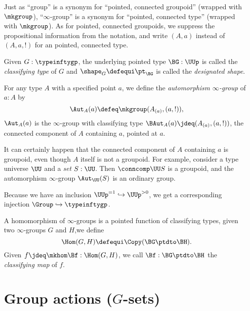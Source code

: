 \begin{remark}\label{rem:pointedtypes}
  Just as ``group'' is a synonym for ``pointed, connected groupoid''
  (wrapped with $\mkgroup$),
  ``$\infty$-group'' is a synonym for ``pointed, connected type''
  (wrapped with $\mkgroup$).
  As for pointed, connected groupoids,
  we suppress the propositional information from the notation,
  and write $(A,a)$ instead of $(A,a,!)$ for an pointed, connected type.
\end{remark}

\begin{definition}\label{def:classifyingspace}
  Given $G:\typeinftygp$,
  the underlying pointed type $\BG : \UUp$
  is called the  \emph{classifying type} of $G$ and $\shape_G\defequi \pt_{\BG}$
  is called the \emph{designated shape}.
\end{definition}

\begin{definition}
  For any type $A$ with a specified point $a$,
  we define the \emph{automorphism $\infty$-group} of $a:A$ by
  \[
    \Aut_A(a) \defeq \mkgroup (A_{(a)},(a,!)),
  \]
  \ie $\Aut_A(a)$ is the $\infty$-group with classifying type
  $\BAut_A(a) \jdeq (A_{(a)},(a,!))$,
  the connected component of $A$ containing $a$, pointed at $a$.
\end{definition}

\begin{remark}\label{rem:autinfgp}
  It can certainly happen that the connected component of $A$ containing $a$
  is groupoid, even though $A$ itself is not a groupoid.
  For example, consider a type universe $\UU$ and a \emph{set} $S:\UU$.
  Then $\conncomp\UU S$ is a groupoid, and the automorphism $\infty$-group
  $\Aut_\UU(S)$ is an ordinary group.

  Because we have an inclusion $\UUp^{=1} \hookrightarrow \UUp^{>0}$,
  we get a corresponding injection $\Group \hookrightarrow \typeinftygp$.
\end{remark}

\begin{definition}
  A homomorphism of $\infty$-groups is a pointed function of classifying types, \ie
  given two $\infty$-groups $G$ and $H$,we define
  \[
    \Hom(G,H)\defequi\Copy(\BG\ptdto\BH).
  \]
  Given $f \jdeq \mkhom\Bf: \Hom(G,H)$, we call
  $\Bf : \BG\ptdto\BH$ the \emph{classifying map} of $f$.
\end{definition}

\section{Group actions ($G$-sets)}
\label{sec:gsets}

